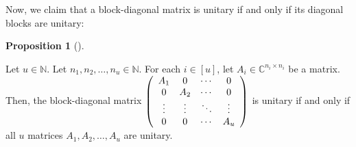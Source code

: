 \documentclass[numbers=enddot,12pt,final,onecolumn,notitlepage]{scrartcl}%
\numberwithin{exer}{subsection}
\theoremstyle{definition}
\newtheorem{prop}[theo]{Proposition}
\newenvironment{proposition}[1][]
{\begin{prop}[#1]\begin{leftbar}}
{\end{leftbar}\end{prop}}
\begin{document}
Now, we claim that a block-diagonal matrix is unitary if and only if its
diagonal blocks are unitary:

\begin{proposition}
\label{prop.blockmatrix.unitary-diag}Let $u\in\mathbb{N}$. Let $n_{1}%
,n_{2},\ldots,n_{u}\in\mathbb{N}$. For each $i\in\left[  u\right]  $, let
$A_{i}\in\mathbb{C}^{n_{i}\times n_{i}}$ be a matrix. Then, the block-diagonal
matrix $\left(
\begin{array}
[c]{cccc}%
A_{1} & 0 & \cdots & 0\\
0 & A_{2} & \cdots & 0\\
\vdots & \vdots & \ddots & \vdots\\
0 & 0 & \cdots & A_{u}%
\end{array}
\right)  $ is unitary if and only if all $u$ matrices $A_{1},A_{2}%
,\ldots,A_{u}$ are unitary.
\end{proposition}
\end{document}
